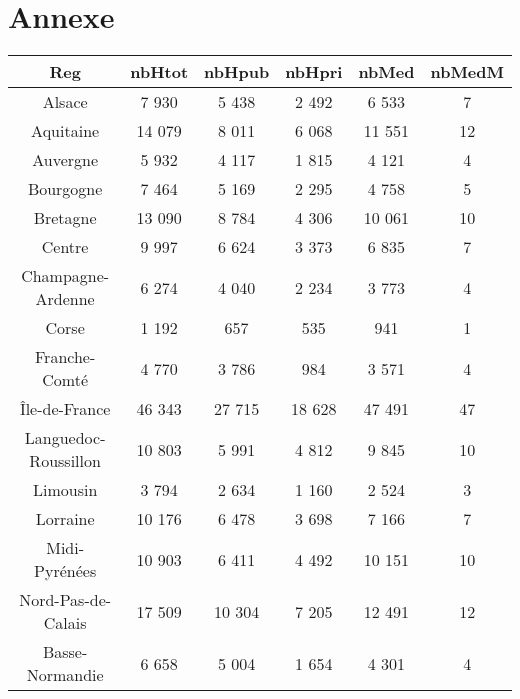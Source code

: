 \documentclass[a4paper,11pt]{article}
\begin{document}
\newpage

\section*{Annexe}
\begin{table}[ht]

\begin{tabular}{|c||c|c|c||c|c|}
\hline 
\textbf{Reg}&\textbf{nbHtot}&\textbf{nbHpub}&\textbf{nbHpri}&\textbf{nbMed}&\textbf{nbMedM}\\ \hline \hline

Alsace&7 930&5 438&2 492&6 533&7\\ \hline

Aquitaine&14 079&8 011&6 068&11 551&12\\ \hline

Auvergne&5 932&4 117&1 815&4 121&4\\ \hline

Bourgogne&7 464&5 169&2 295&4 758&5\\ \hline

Bretagne&13 090&8 784&4 306&10 061&10\\ \hline

Centre&9 997&6 624&3 373&6 835&7\\ \hline

Champagne-Ardenne&6 274&4 040&2 234&3 773&4\\ \hline

Corse&1 192&657&535&941&1\\ \hline

Franche-Comté&4 770&3 786&984&3 571&4\\ \hline

Île-de-France&46 343&27 715&18 628&47 491&47\\ \hline

Languedoc-Roussillon&10 803&5 991&4 812&9 845&10\\ \hline

Limousin&3 794&2 634&1 160&2 524&3\\ \hline

Lorraine&10 176&6 478&3 698&7 166&7\\ \hline

Midi-Pyrénées&10 903&6 411&4 492&10 151&10\\ \hline

Nord-Pas-de-Calais&17 509&10 304&7 205&12 491&12\\ \hline

Basse-Normandie&6 658&5 004&1 654&4 301&4\\ \hline


\end{tabular}
\end{table}
\end{document}
